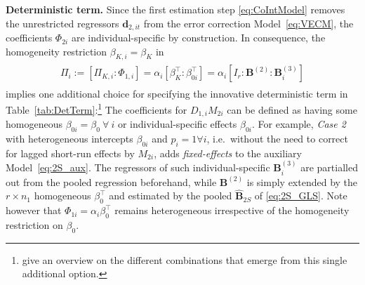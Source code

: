 \textbf{Deterministic term.} Since the first estimation step \eqref{eq:CoIntModel} removes the unrestricted regressors $ \boldsymbol{d}_{2,it} $ from the error correction Model~\eqref{eq:VECM}, the coefficients $ \Phi_{2i} $ are individual-specific by construction. In consequence, the homogeneity restriction $ \beta_{K,i} = \beta_K $ in 
\begin{align} \label{eq:2S_det}
\begin{split}
	\Pi_i := \left[ \Pi_{K,i} : \Phi_{1,i} \right] = \alpha_i \left[ \beta_{K}^\top : \beta_{0i}^\top \right] = \alpha_i \left[I_r^{\ } : \mathbf{B}_{\ }^{(2)} : \mathbf{B}_i^{(3)} \right]
\end{split}
\end{align}
implies one additional choice for specifying the innovative deterministic term in Table~\ref{tab:DetTerm}:\footnote{\citet[Ch.~4.1]{GroenFrank2003} give an overview on the different combinations that emerge from this single additional option.} 
The coefficients for $ D_{1,i} M_{2i} $ can be defined as having some homogeneous $ \beta_{0i} = \beta_{0} \ \forall \ i $ or individual-specific effects $ \beta_{0i} $. For example, \textit{Case 2} with heterogeneous intercepts $ \beta_{0i} $ and $ p_i = 1 \forall i $, i.e.~without the need to correct for lagged short-run effects by $ M_{2i} $, adds \textit{fixed-effects} to the auxiliary Model~\eqref{eq:2S_aux}. The regressors of such individual-specific $ \mathbf{B}_i^{(3)} $ are partialled out from the pooled regression beforehand, while $ \mathbf{B}^{(2)} $ is simply extended by the $ r \times n_1 $ homogeneous $ \beta_{0}^\top $ and estimated by the pooled $ \widehat{\mathbf{B}}_{2S} $ of \eqref{eq:2S_GLS}. Note however that $ \Phi_{1i} = \alpha_{i} \beta_{0}^\top $ remains heterogeneous irrespective of the homogeneity restriction on $ \beta_{0} $.


